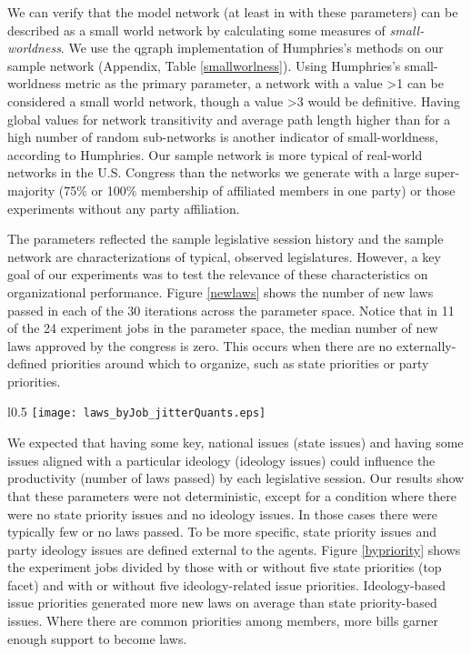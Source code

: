\documentclass[pdftex,12pt]{llncs}
\begin{document}
We can verify that the model network (at least in with these parameters) can be described as a small world network by calculating some measures of \textit{small-worldness}. 
We use the qgraph implementation \parencite{ec12} of Humphries's methods \parencite{hg08} on our sample network (Appendix, Table \ref{smallworlness}). 
Using Humphries's small-worldness metric as the primary parameter, a network with a value \textgreater 1 can be considered a small world network, though a value \textgreater 3 would be definitive. 
Having global values for network transitivity and average path length higher than for a high number of random sub-networks is another indicator of small-worldness, according to Humphries. 
Our sample network is more typical of real-world networks in the U.S. Congress than the networks we generate with a large super-majority (75\% or 100\% membership of affiliated members in one party) or those experiments without any party affiliation. 

The parameters reflected the sample legislative session history and the sample network are characterizations of typical, observed legislatures. 
However, a key goal of our experiments was to test the relevance of these characteristics on organizational performance.  
Figure \ref{newlaws} shows the number of new laws passed in each of the 30 iterations across the parameter space. 
Notice that in 11 of the 24 experiment jobs in the parameter space, the median number of new laws approved by the congress is zero.
This occurs when there are no externally-defined priorities around which to organize, such as state priorities or party priorities.

\begin{wrapfigure}{l}{0.5\textwidth}
  \texttt{[image: laws\_byJob\_jitterQuants.eps]}
 \caption[ ]{Some parameters produce no or few new laws in most legislative sessions---typically, when there are no externally-defined priorities.}
 \label{newlaws}
\end{wrapfigure}

We expected that having some key, national issues (state issues) and having some issues aligned with a particular ideology (ideology issues) could influence the productivity (number of laws passed) by each legislative session. 
Our results show that these parameters were not deterministic, except for a condition where there were no state priority issues and no ideology issues.
In those cases there were typically few or no laws passed. 
To be more specific, state priority issues and party ideology issues are defined external to the agents. 
Figure \ref{bypriority} shows the experiment jobs divided by those with or without five state priorities (top facet) and with or without five ideology-related issue priorities. 
Ideology-based issue priorities generated more new laws on average than state priority-based issues. 
Where there are common priorities among members, more bills garner enough support to become laws. 
\end{document}
